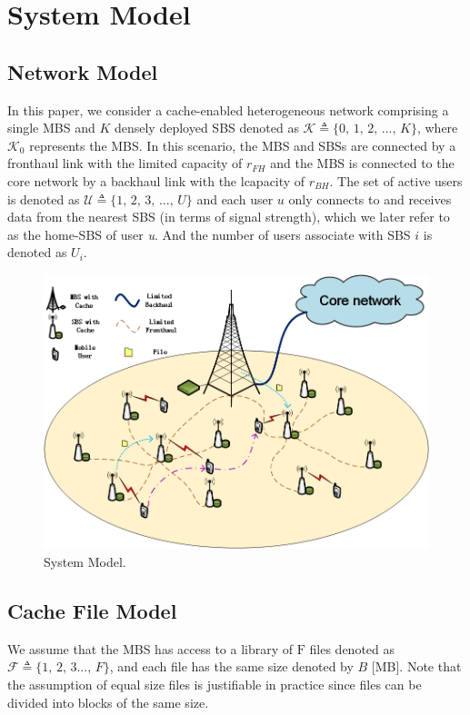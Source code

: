 \documentclass[conference]{IEEEtran}
\begin{document}
\section{System Model}
\subsection{Network Model}
In this paper, we consider a cache-enabled heterogeneous network comprising a single MBS and $K$ densely deployed SBS denoted as $\mathcal{K} \triangleq\{0\mathrm{,\,}1\mathrm{,\,}2\mathrm{,\,}...\mathrm{,\,}K\}$, where $\mathcal{K}_0$ represents the MBS. In this scenario, the MBS and SBSs are connected by a fronthaul link with the limited capacity of $r_{FH}$ and the MBS is connected to the core network by a backhaul link with the lcapacity of $ r_{BH}$. The set of active users is denoted as $\mathcal{U} \triangleq\{1\mathrm{,\,}2\mathrm{,\,}3\mathrm{,\,}...\mathrm{,\,}U\}$ and each user $u$ only connects to and receives data from the nearest SBS (in terms of signal strength), which we later refer to as the  home-SBS of user \emph{u}. And the number of users associate with SBS $i$ is denoted as $U_i$.

\begin{figure}[htbp]
 \centerline{\includegraphics[scale=0.5]{fig1.png}}
 \caption{System Model.}
 \label{fig 1}
\end{figure}

\subsection{Cache File Model}
We assume that the MBS has access to a library of $\mathrm{F}$ files denoted as $\mathcal{F} \triangleq\{1\mathrm{,\,}2\mathrm{,\,}3...\mathrm{,\,}F\}$, and each file has the same size denoted by $B$ [MB]. Note that the assumption of equal size files is justifiable in practice since files can be divided into blocks of the same size.
\end{document}
